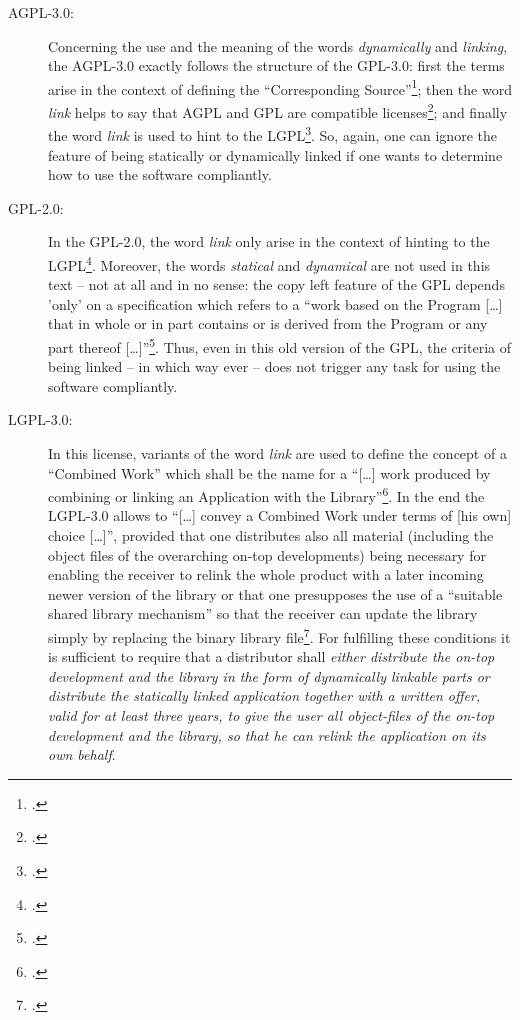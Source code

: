 \begin{description}
  \item[AGPL-3.0:] Concerning the use and the meaning of the words
  \emph{dynamically} and \emph{linking}, the AGPL-3.0 exactly follows the
  structure of the GPL-3.0: first the terms arise in the context of defining the
  \enquote{Corresponding Source}\footcite[cf.][\nopage wp.\
  §0]{Agpl30OsiLicense2007a}; then the word \emph{link} helps to say that AGPL
  and GPL are compatible licenses\footcite[cf.][\nopage wp.\
  §13]{Agpl30OsiLicense2007a}; and finally the word \emph{link} is used to hint
  to the LGPL\footcite[cf.][\nopage wp.\ §5]{Agpl30OsiLicense2007a}. So, again,
  one can ignore the feature of being statically or dynamically linked if one
  wants to determine how to use the software compliantly.

  \item[GPL-2.0:] In the GPL-2.0, the word \emph{link} only arise in the context
  of hinting to the LGPL\footcite [cf.][\nopage wp.\ last
  paragraph]{Gpl20OsiLicense1991a}. Moreover, the words \emph{statical} and
  \emph{dynamical} are not used in this text -- not at all and in no sense: the
  copy left feature of the GPL depends 'only' on a specification which refers to
  a \enquote{work based on the Program [\ldots] that in whole or in part
  contains or is derived from the Program or any part thereof [\ldots]}\footcite
  [cf.][\nopage wp.\ §2]{Gpl20OsiLicense1991a}. Thus, even in this old version
  of the GPL, the criteria of being linked -- in which way ever -- does not
  trigger any task for using the software compliantly.

  \item[LGPL-3.0:] In this license, variants of the word \emph{link} are used to
  define the concept of a \enquote{Combined Work} which shall be the name for a
  \enquote{[\ldots] work produced by combining or linking an Application with
  the Library}\footcite [cf.][\nopage wp.\ §0]{Lgpl30OsiLicense2007a}. In the
  end the LGPL-3.0 allows to \enquote{[\ldots] convey a Combined Work under
  terms of [his own] choice [\ldots]}, provided that one distributes also all
  material (including the object files of the overarching on-top developments)
  being necessary for enabling the receiver to relink the whole product with a
  later incoming newer version of the library or that one presupposes the use of
  a \enquote{suitable shared library mechanism} so that the receiver can update
  the library simply by replacing the binary library file\footcite[cf.][\nopage
  wp.\ §4]{Lgpl30OsiLicense2007a}. For fulfilling these conditions it is
  sufficient to require that a distributor shall \emph{either distribute the
  on-top development and the library in the form of dynamically linkable parts
  or distribute the statically linked application together with a written offer,
  valid for at least three years, to give the user all object-files of the
  on-top development and the library, so that he can relink the application on
  its own behalf}.


\end{description}
